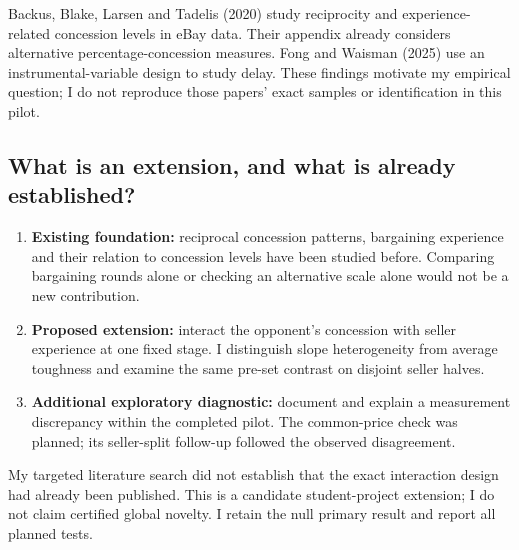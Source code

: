 \documentclass[11pt,a4paper]{article}
\begin{document}
Backus, Blake, Larsen and Tadelis (2020) study reciprocity and experience-related
concession levels in eBay data. Their appendix already considers alternative
percentage-concession measures. Fong and Waisman (2025) use an instrumental-variable
design to study delay. These findings motivate my empirical question;
I do not reproduce those papers' exact samples or identification in this pilot.

\subsection{What is an extension, and what is already established?}
\begin{enumerate}
\item \textbf{Existing foundation:} reciprocal concession patterns, bargaining
experience and their relation to concession levels have been studied before.
Comparing bargaining rounds alone or checking an alternative scale alone
would not be a new contribution.
\item \textbf{Proposed extension:} interact the opponent's concession with
seller experience at one fixed stage. I distinguish slope heterogeneity from
average toughness and examine the same pre-set contrast on disjoint seller halves.
\item \textbf{Additional exploratory diagnostic:} document and explain a
measurement discrepancy within the completed pilot. The common-price check
was planned; its seller-split follow-up followed the observed disagreement.
\end{enumerate}
My targeted literature search did not establish that the exact interaction
design had already been published. This is a candidate student-project
extension; I do not claim certified global novelty. I retain the null primary
result and report all planned tests.
\end{document}
